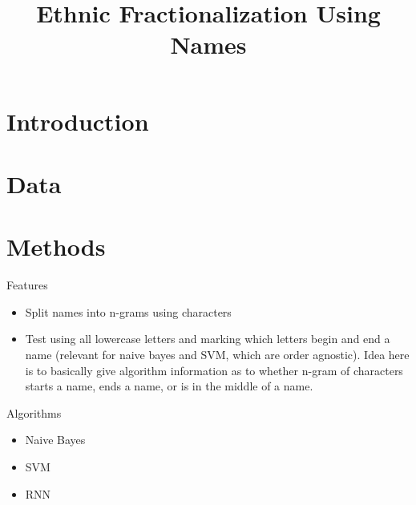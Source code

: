 \documentclass[11pt, oneside]{article}
\title{Ethnic Fractionalization Using Names}
\author{}
\date{}
\begin{document}
\maketitle

\section{Introduction}

\section{Data}

\section{Methods}

\noindent Features
\begin{itemize}
\item Split names into n-grams using characters
\item Test using all lowercase letters and marking which letters begin and end a name (relevant for naive bayes and SVM, which are order agnostic). Idea here is to basically give algorithm information as to whether n-gram of characters starts a name, ends a name, or is in the middle of a name.
\end{itemize}

\noindent Algorithms
\begin{itemize}
\item Naive Bayes
\item SVM
\item RNN
\end{itemize}

\end{document}
